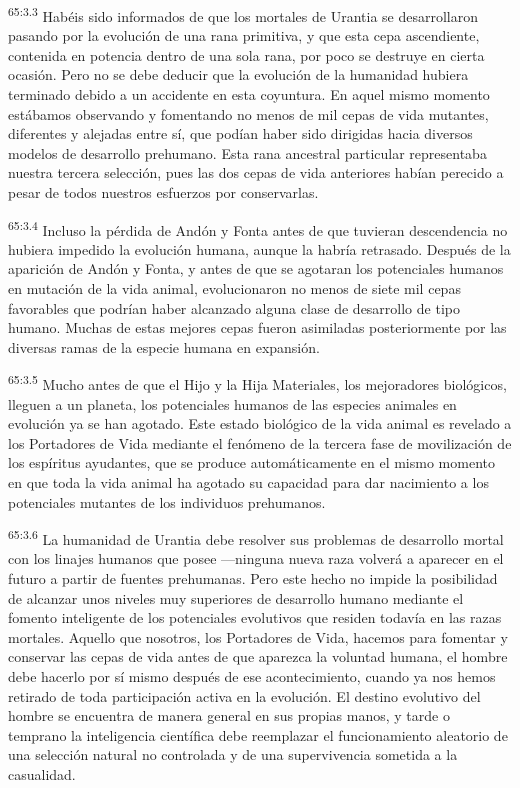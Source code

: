 \par
\textsuperscript{65:3.3} Habéis sido informados de que los mortales de Urantia se desarrollaron pasando por la evolución de una rana primitiva, y que esta cepa ascendiente, contenida en potencia dentro de una sola rana, por poco se destruye en cierta ocasión. Pero no se debe deducir que la evolución de la humanidad hubiera terminado debido a un accidente en esta coyuntura. En aquel mismo momento estábamos observando y fomentando no menos de mil cepas de vida mutantes, diferentes y alejadas entre sí, que podían haber sido dirigidas hacia diversos modelos de desarrollo prehumano. Esta rana ancestral particular representaba nuestra tercera selección, pues las dos cepas de vida anteriores habían perecido a pesar de todos nuestros esfuerzos por conservarlas.

\par
\textsuperscript{65:3.4} Incluso la pérdida de Andón y Fonta antes de que tuvieran descendencia no hubiera impedido la evolución humana, aunque la habría retrasado. Después de la aparición de Andón y Fonta, y antes de que se agotaran los potenciales humanos en mutación de la vida animal, evolucionaron no menos de siete mil cepas favorables que podrían haber alcanzado alguna clase de desarrollo de tipo humano. Muchas de estas mejores cepas fueron asimiladas posteriormente por las diversas ramas de la especie humana en expansión.

\par
\textsuperscript{65:3.5} Mucho antes de que el Hijo y la Hija Materiales, los mejoradores biológicos, lleguen a un planeta, los potenciales humanos de las especies animales en evolución ya se han agotado. Este estado biológico de la vida animal es revelado a los Portadores de Vida mediante el fenómeno de la tercera fase de movilización de los espíritus ayudantes, que se produce automáticamente en el mismo momento en que toda la vida animal ha agotado su capacidad para dar nacimiento a los potenciales mutantes de los individuos prehumanos.

\par
\textsuperscript{65:3.6} La humanidad de Urantia debe resolver sus problemas de desarrollo mortal con los linajes humanos que posee ---ninguna nueva raza volverá a aparecer en el futuro a partir de fuentes prehumanas. Pero este hecho no impide la posibilidad de alcanzar unos niveles muy superiores de desarrollo humano mediante el fomento inteligente de los potenciales evolutivos que residen todavía en las razas mortales. Aquello que nosotros, los Portadores de Vida, hacemos para fomentar y conservar las cepas de vida antes de que aparezca la voluntad humana, el hombre debe hacerlo por sí mismo después de ese acontecimiento, cuando ya nos hemos retirado de toda participación activa en la evolución. El destino evolutivo del hombre se encuentra de manera general en sus propias manos, y tarde o temprano la inteligencia científica debe reemplazar el funcionamiento aleatorio de una selección natural no controlada y de una supervivencia sometida a la casualidad.

